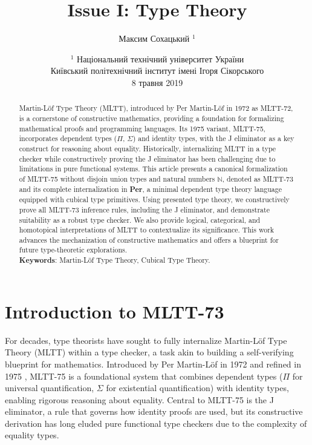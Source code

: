 \documentclass{article}
\begin{document}
\title{Issue I: Type Theory}
\author{Максим Сохацький $^1$}
\date{ $^1$ Національний технічний університет України \\
       \small Київський політехнічний інститут імені Ігоря Сікорського \\
       8 травня 2019 }

\maketitle

\begin{abstract}
Martin-Löf Type Theory (MLTT), introduced by Per Martin-Löf in 1972 as MLTT-72,
is a cornerstone of constructive mathematics, providing a foundation
for formalizing mathematical proofs and programming languages.
Its 1975 variant, MLTT-75, incorporates dependent types ($\Pi$, $\Sigma$)
and identity types, with the J eliminator as a key construct for reasoning about equality.
Historically, internalizing MLTT in a type checker while constructively
proving the J eliminator has been challenging due to limitations in pure
functional systems. This article presents a canonical formalization of
MLTT-75 without disjoin union types and natural numbers $\mathbb{N}$, denoted as MLTT-73
and its complete internalization in \textbf{Per}, a minimal dependent type
theory language equipped with cubical type primitives. Using presented type
theory, we constructively prove all MLTT-73 inference rules, including
the J eliminator, and demonstrate suitability as a robust type checker.
We also provide logical, categorical, and homotopical
interpretations of MLTT to contextualize its significance.
This work advances the mechanization of constructive mathematics and offers
a blueprint for future type-theoretic explorations. \\
\indent \textbf{Keywords}: Martin-Löf Type Theory, Cubical Type Theory.
\end{abstract}

\ifincludeTOC
  \tableofcontents
\fi

\section*{Introduction to MLTT-73}

For decades, type theorists have sought to fully internalize
Martin-Löf Type Theory (MLTT) within a type checker, a task
akin to building a self-verifying blueprint for mathematics.
Introduced by Per Martin-Löf in 1972 \cite{Lof72} and refined
in 1975 \cite{Lof75}, MLTT-75 is a foundational system that
combines dependent types ($\Pi$ for universal quantification,
$\Sigma$ for existential quantification) with identity types,
enabling rigorous reasoning about equality. Central to MLTT-75
is the J eliminator, a rule that governs how identity proofs
are used, but its constructive derivation has long eluded pure
functional type checkers due to the complexity of equality types.
\end{document}
